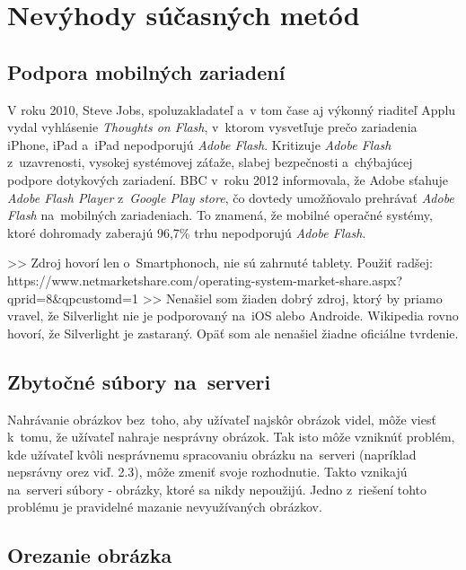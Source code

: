 \graphicspath{ {img/23/} }

\chapter{Nevýhody súčasných metód}
\section{Podpora mobilných zariadení}

V roku 2010, Steve Jobs, spoluzakladateľ a~v tom čase aj výkonný riaditeľ Applu vydal vyhlásenie \emph{Thoughts on Flash}\cite{Apple_flash}, v~ktorom vysvetľuje prečo zariadenia iPhone, iPad a~iPad nepodporujú \emph{Adobe Flash}. Kritizuje \emph{Adobe Flash} z~uzavrenosti, vysokej systémovej záťaže, slabej bezpečnosti a~chýbajúcej podpore dotykových zariadení.
BBC v~roku 2012 informovala\cite{Android_flash}, že Adobe sťahuje \emph{Adobe Flash Player} z~\emph{Google Play store}, čo dovtedy umožňovalo prehrávať \emph{Adobe Flash} na~mobilných zariadeniach. To znamená, že mobilné operačné systémy, ktoré dohromady zaberajú 96,7\% trhu\cite{Mobile_OS_share} nepodporujú \emph{Adobe Flash}.


>> Zdroj hovorí len o~Smartphonoch, nie sú zahrnuté tablety. Použiť radšej: https://www.netmarketshare.com/operating-system-market-share.aspx?qprid=8&qpcustomd=1
>> Nenašiel som žiaden dobrý zdroj, ktorý by priamo vravel, že Silverlight nie je podporovaný na~iOS alebo Androide. Wikipedia rovno hovorí, že Silverlight je zastaraný. Opäť som ale nenašiel žiadne oficiálne tvrdenie.


\section{Zbytočné súbory na~serveri}

Nahrávanie obrázkov bez~toho, aby užívateľ najskôr obrázok videl, môže viesť k~tomu, že užívateľ nahraje nesprávny obrázok. Tak isto môže vzniknúť problém, kde užívateľ kvôli nesprávnemu spracovaniu obrázku na~serveri (napríklad nepsrávny orez viď. 2.3), môže zmeniť svoje rozhodnutie. Takto vznikajú na~serveri súbory - obrázky, ktoré sa nikdy nepoužijú. Jedno z~riešení tohto problému je pravidelné mazanie nevyužívaných obrázkov.   

\section{Orezanie obrázka}

